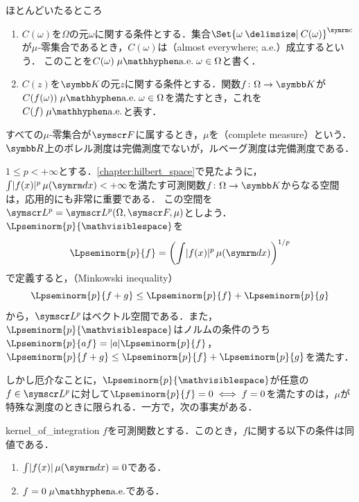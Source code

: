 \documentclass[../../main]{subfiles}
\begin{document}
\begin{definition}{ほとんどいたるところ}{}
  \begin{enumerate}
    \item \(C(\omega)\)を\(\Omega\)の元\(\omega\)に関する条件とする．集合\(\scomp{\Set{\omega\given C(\omega)}}\)が\(\mu\)‐零集合であるとき，\(C(\omega)\)は（almost everywhere; a{.}e{.}）成立するという．
      このことを\(C(\omega)\almosteverywhere[\mu][\omega\in\Omega]\)と書く．
    \item \(C(z)\)を\(\numset{K}\)の元\(z\)に関する条件とする．関数\(f\colon\Omega\to\numset{K}\)が\(C(f(\omega))\almosteverywhere[\mu][\omega\in\Omega]\)を満たすとき，これを\(C(f)\almosteverywhere[\mu]\)と表す．
  \end{enumerate}
\end{definition}

\begin{note}
  すべての\(\mu\)‐零集合が\(\sigmaalg{F}\)に属するとき，\(\mu\)を（complete measure）という．
  \(\numset{R}\)上のボレル測度は完備測度でないが，ルベーグ測度は完備測度である．
\end{note}

\(1\leq p<+\infty\)とする．\cref{chapter:hilbert_space}で見たように，\(\int\abs{f(x)}^p\measured[x]{\mu}<+\infty\)を満たす可測関数\(f\colon\Omega\to\numset{K}\)からなる空間は，応用的にも非常に重要である．
この空間を\(\Lebesgue*{p}=\Lebesgue*{p}(\Omega,\sigmaalg{F},\mu)\)としよう．\(\Lpseminorm{p}{\holder}\)を
\[
  \Lpseminorm{p}{f} = \pqty*{\int\abs{f(x)}^p\measured[x]{\mu}}^{1/p}
\]
で定義すると，（Minkowski inequality）
\begin{equation}
  \label{equation:minkowski}
  \Lpseminorm{p}{f+g} \leq \Lpseminorm{p}{f}+\Lpseminorm{p}{g}
\end{equation}
から，\(\Lebesgue*{p}\)はベクトル空間である．また，\(\Lpseminorm{p}{\holder}\)はノルムの条件のうち\(\Lpseminorm{p}{af}=\abs{a}\Lpseminorm{p}{f}\)，\(\Lpseminorm{p}{f+g}\leq\Lpseminorm{p}{f}+\Lpseminorm{p}{g}\)を満たす．

しかし厄介なことに，\(\Lpseminorm{p}{\holder}\)が任意の\(f\in\Lebesgue*{p}\)に対して\(\Lpseminorm{p}{f}=0\iff f=0\)を満たすのは，\(\mu\)が特殊な測度のときに限られる．一方で，次の事実がある．

\begin{proposition}{}{kernel_of_integration}
  \(f\)を可測関数とする．このとき，\(f\)に関する以下の条件は同値である．
  \begin{enumerate}
    \item \(\int\abs{f(x)}\measured[x]{\mu}=0\)である．
    \item \(f=0\almosteverywhere[\mu]\)である．
  \end{enumerate}
\end{proposition}
\end{document}
